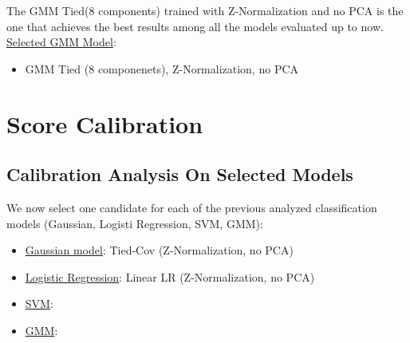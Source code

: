 \documentclass[10pt, a4paper, twocolumn]{article} %
\begin{document}
The GMM Tied(8 components) trained with Z-Normalization and no PCA is the one that achieves
the best results among all the models evaluated up to now.\\
\underline{Selected GMM Model}:
\begin{itemize}
	\item GMM Tied (8 componenets), Z-Normalization, no PCA
\end{itemize}
\section{Score Calibration}
\subsection{Calibration Analysis On Selected Models}
We now select one candidate for each of the previous analyzed classification models (Gaussian, Logisti Regression,
SVM, GMM):
\begin{itemize}
	\item \underline{Gaussian model}: Tied-Cov (Z-Normalization, no PCA)
	\item \underline{Logistic Regression}: Linear LR (Z-Normalization, no PCA)
	\item \underline{SVM}: 
	\item \underline{GMM}:
\end{itemize}
\end{document}
